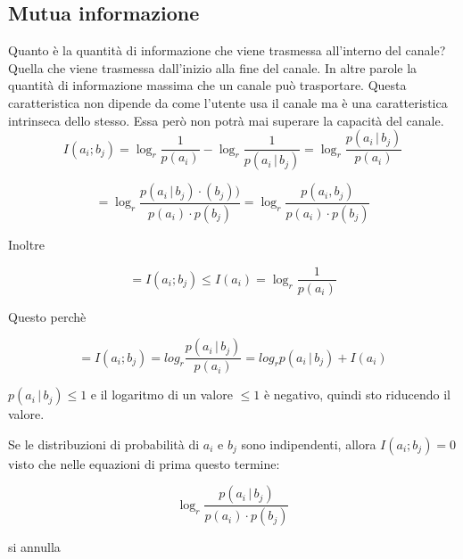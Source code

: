 \subsection*{Mutua informazione}
Quanto è la quantità di informazione che viene trasmessa all'interno del canale? Quella che viene trasmessa dall'inizio alla fine del canale. In altre parole la quantità di informazione massima che un canale può trasportare.
Questa caratteristica non dipende da come l'utente usa il canale ma è una caratteristica intrinseca dello stesso. Essa però non potrà mai superare la capacità del canale.
\begin{equation*}
I(a_i;b_j) = \log_r\frac{1}{p(a_i)} - \log_r\frac{1}{p(a_i\,|\,b_j)} = \log_r\frac{p(a_i\,|\,b_j)}{p(a_i)}
\end{equation*}

\begin{equation*}
= \log_r\frac{p(a_i\,|\,b_j)\cdotp(b_j))}{p(a_i)\cdot p(b_j)} =  \log_r\frac{p(a_i,b_j)}{p(a_i)\cdot p(b_j)} 
\end{equation*}

Inoltre 

\begin{equation*}
= I(a_i;b_j) \leq I(a_i) = \log_r\frac{1}{p(a_i)}
\end{equation*}

Questo perchè

\begin{equation*}
= I(a_i;b_j) = log_r\frac{p(a_i\,|\,b_j)}{p(a_i)} = log_rp(a_i\,|\,b_j) + I(a_i)
\end{equation*}

$p(a_i\,|\,b_j) \leq 1 $ e il logaritmo di un valore $\leq 1$ è negativo, quindi sto riducendo il valore.

Se le distribuzioni di probabilità di $a_i$ e $b_j$ sono indipendenti, allora $I(a_i;b_j) = 0$ visto che nelle equazioni di prima questo termine:

\begin{equation*}
\log_r\frac{p(a_i\,|\,b_j)}{p(a_i)\cdot p(b_j)}
\end{equation*}

si annulla






 